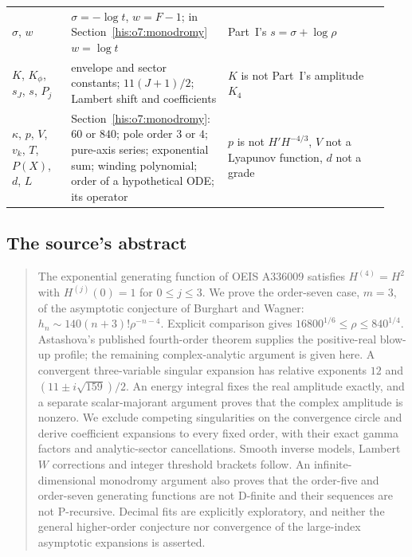 \documentclass[11pt]{article}
\theoremstyle{remark}\newtheorem{remark}[theorem]{Remark}
\numberwithin{equation}{section}
\begin{document}
\begin{center}
\begin{tabular}{@{}>{\raggedright\arraybackslash}p{0.15\linewidth}>{\raggedright\arraybackslash}p{0.38\linewidth}>{\raggedright\arraybackslash}p{0.41\linewidth}@{}}
$\sigma$, $w$ & $\sigma=-\log t$, $w=F-1$; in Section~\ref{his:o7:monodromy} $w=\log t$ & Part~I's $s=\sigma+\log\rho$\\
$K$, $K_\phi$, $s_J$, $s$, $P_j$ & envelope and sector constants; $11(J+1)/2$; Lambert shift and coefficients & $K$ is not Part~I's amplitude $K_4$\\
$\kappa$, $p$, $V$, $v_k$, $T$, $P(X)$, $d$, $L$ & Section~\ref{his:o7:monodromy}: $60$ or $840$; pole order $3$ or $4$; pure-axis series; exponential sum; winding polynomial; order of a hypothetical ODE; its operator & $p$ is not $H'H^{-4/3}$, $V$ not a Lyapunov function, $d$ not a grade\\
\bottomrule
\end{tabular}
\end{center}

\subsection{The source's abstract}\label{his:o7:sec:abstract}
\begin{quote}\small
The exponential generating function of OEIS A336009 satisfies
$H^{(4)}=H^2$ with $H^{(j)}(0)=1$ for $0\le j\le3$.
We prove the order-seven case, $m=3$, of the asymptotic conjecture of
Burghart and Wagner: $h_n\sim140(n+3)!\rho^{-n-4}$.
Explicit comparison gives $16800^{1/6}\le\rho\le840^{1/4}$.
Astashova's published fourth-order theorem supplies the positive-real
blow-up profile; the remaining complex-analytic argument is given here.
A convergent three-variable singular expansion has relative exponents
$12$ and $(11\pm i\sqrt{159})/2$. An energy integral fixes the real
amplitude exactly, and a separate scalar-majorant argument proves that
the complex amplitude is nonzero. We exclude competing singularities
on the convergence circle and derive coefficient expansions to every
fixed order, with their exact gamma factors and analytic-sector
cancellations. Smooth inverse models, Lambert $W$ corrections and
integer threshold brackets follow. An infinite-dimensional monodromy argument
also proves that the order-five and order-seven generating functions are
not D-finite and their sequences are not P-recursive. Decimal fits are explicitly
exploratory, and neither the general higher-order conjecture nor
convergence of the large-index asymptotic expansions is asserted.
\end{quote}
\end{document}
